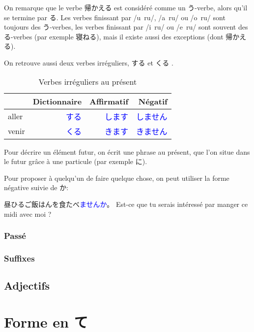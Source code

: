 \documentclass[a4paper,10pt,french,openany]{memoir}
\newcommand{\term}[1]{\textcolor{blue}{#1}}
\begin{document}
On remarque que le verbe \ruby 帰{かえ}る est considéré comme un う-verbe, alors qu'il se termine par る.
Les verbes finissant par /u~ru/, /a~ru/ ou /o~ru/ sont toujours des う-verbes, les verbes finissant par /i~ru/ ou /e~ru/ sont souvent des る-verbes (par exemple \ruby 寝{ね}る), mais il existe aussi des exceptions (dont \ruby 帰{かえ}る).

On retrouve aussi deux verbes irréguliers, する et くる .

\begin{table}[h]
 \centering
 \caption{Verbes irréguliers au présent}
 \label{tab:irregulier-verbes-present}
 \begin{tabular}{lrrr}
   & Dictionnaire & Affirmatif & Négatif \\
  \hline
  aller & \term{する} & \term{します} & \term{しません} \\
  venir & \term{くる} & \term{きます} & \term{きません} \\
 \end{tabular}
\end{table}

Pour décrire un élément futur, on écrit une phrase au présent, que l'on situe dans le futur grâce à une particule (par exemple に).

Pour proposer à quelqu'un de faire quelque chose, on peut utiliser la forme négative suivie de か:
\begin{cquote}{ }
 \ruby 昼{ひる}ご\ruby 飯{はん}を\ruby 食{た}べ\term{ませんか}。
 Est-ce que tu serais intéressé par manger ce midi avec moi ?
\end{cquote}


\subsubsection{Passé}


\subsubsection{Suffixes}

\subsection{Adjectifs}\label{sec:adjectifs}

\section{Forme en て}
\end{document}
